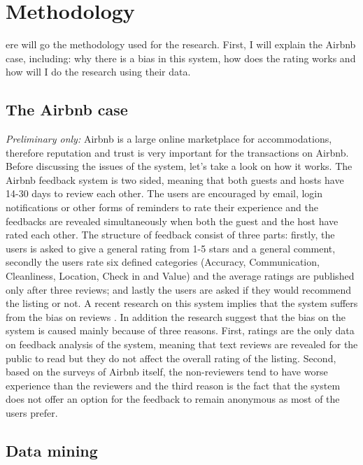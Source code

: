 %
%
\let\textcircled=\pgftextcircled
\chapter{Methodology}
\label{chap:methods}

ere will go the methodology used for the research. First, I will explain the Airbnb case, including: why there is a bias in this system, how does the rating works and how will I do the research using their data. 
\section{The Airbnb case}
\textit{Preliminary only:} Airbnb is a large online marketplace for accommodations, therefore reputation and trust is very important for the transactions on Airbnb. Before discussing the issues of the system, let’s take a look on how it works. The Airbnb feedback system is two sided, meaning that both guests and hosts have 14-30 days to review each other. The users are encouraged by email, login notifications or other forms of reminders to rate their experience and the feedbacks are revealed simultaneously when both the guest and the host have rated each other. The structure of feedback consist of three parts: firstly, the users is asked to give a general rating from 1-5 stars and a general comment, secondly the users rate six defined categories (Accuracy, Communication, Cleanliness, Location, Check in and Value) and the average ratings are published only after three reviews; and lastly the users are asked if they would recommend the listing or not. A recent research on this system implies that the system suffers from the bias on reviews \cite{fradkin2016bias}. In addition the research suggest that the bias on the system is caused mainly because of three reasons. First, ratings are the only data on feedback analysis of the system, meaning that text reviews are revealed for the public to read but they do not affect the overall rating of the listing. Second, based on the surveys of Airbnb itself, the non-reviewers tend to have worse experience than the reviewers and the third reason is the fact that the system does not offer an option for the feedback to remain anonymous as most of the users prefer.

\section{Data mining}
